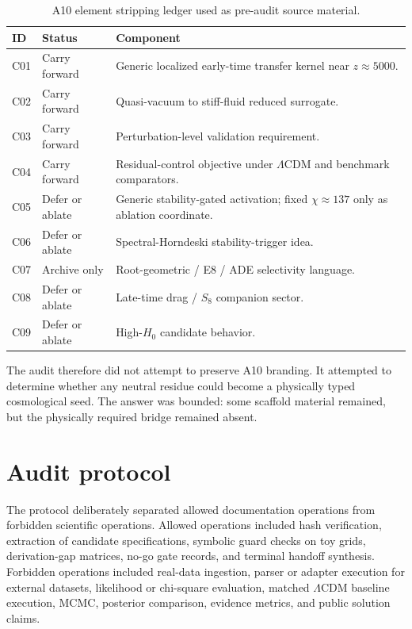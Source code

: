 \documentclass[11pt,a4paper]{article}
\newcommand{\LCDM}{$\Lambda$CDM}
\begin{document}
\begin{table}[H]
\centering
\small
\caption{A10 element stripping ledger used as pre-audit source material.}
\label{tab:strip}
\begin{tabularx}{\textwidth}{p{16mm}p{31mm}Y}
\toprule
ID & Status & Component \\
\midrule
C01 & Carry forward & Generic localized early-time transfer kernel near $z \approx 5000$. \\
C02 & Carry forward & Quasi-vacuum to stiff-fluid reduced surrogate. \\
C03 & Carry forward & Perturbation-level validation requirement. \\
C04 & Carry forward & Residual-control objective under \LCDM{} and benchmark comparators. \\
C05 & Defer or ablate & Generic stability-gated activation; fixed $\chi \approx 137$ only as ablation coordinate. \\
C06 & Defer or ablate & Spectral-Horndeski stability-trigger idea. \\
C07 & Archive only & Root-geometric / E8 / ADE selectivity language. \\
C08 & Defer or ablate & Late-time drag / $S_8$ companion sector. \\
C09 & Defer or ablate & High-$H_0$ candidate behavior. \\
\bottomrule
\end{tabularx}
\end{table}

The audit therefore did not attempt to preserve A10 branding. It attempted to determine whether any neutral residue could become a physically typed cosmological seed. The answer was bounded: some scaffold material remained, but the physically required bridge remained absent.

\section{Audit protocol}

The protocol deliberately separated allowed documentation operations from forbidden scientific operations. Allowed operations included hash verification, extraction of candidate specifications, symbolic guard checks on toy grids, derivation-gap matrices, no-go gate records, and terminal handoff synthesis. Forbidden operations included real-data ingestion, parser or adapter execution for external datasets, likelihood or chi-square evaluation, matched \LCDM{} baseline execution, MCMC, posterior comparison, evidence metrics, and public solution claims.
\end{document}
